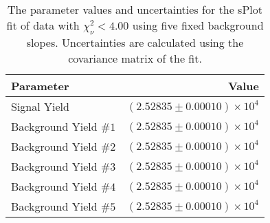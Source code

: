 
\begin{table}[h]
    \begin{center}
        \begin{tabular}{lr}\toprule
            Parameter & Value \\\midrule
            Signal Yield & $(2.52835 \pm 0.00010) \times 10^{4}$ \\
            Background Yield $\#1$ & $(2.52835 \pm 0.00010) \times 10^{4}$ \\
            Background Yield $\#2$ & $(2.52835 \pm 0.00010) \times 10^{4}$ \\
            Background Yield $\#3$ & $(2.52835 \pm 0.00010) \times 10^{4}$ \\
            Background Yield $\#4$ & $(2.52835 \pm 0.00010) \times 10^{4}$ \\
            Background Yield $\#5$ & $(2.52835 \pm 0.00010) \times 10^{4}$ \\\bottomrule
        \end{tabular}
        \caption{The parameter values and uncertainties for the sPlot fit of data with $\chi^2_\nu < 4.00$ using five fixed background slopes. Uncertainties are calculated using the covariance matrix of the fit.}
    \end{center}
\end{table}
